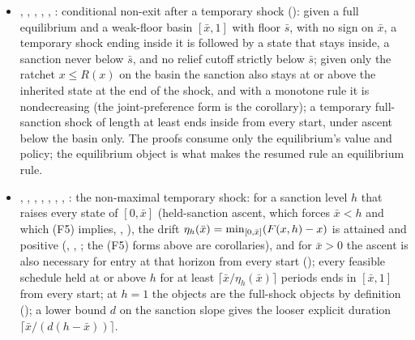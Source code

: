 \begin{itemize}[leftmargin=1.4em,itemsep=1pt]
\item {}, , , , , : conditional non-exit after a temporary shock (): given a full equilibrium and a weak-floor basin $[\bar x,1]$ with floor $\bar s$, with no sign on $\bar x$, a temporary shock ending inside it is followed by a state that stays inside, a sanction never below $\bar s$, and no relief cutoff strictly below $\bar s$; given only the ratchet $x\le R(x)$ on the basin the sanction also stays at or above the inherited state at the end of the shock, and with a monotone rule it is nondecreasing (the joint-preference form is the corollary); a temporary full-sanction shock of length at least  ends inside from every start, under ascent below the basin only. The proofs consume only the equilibrium's value and policy; the equilibrium object is what makes the resumed rule an equilibrium rule.
\item {}, , , , , , , : the non-maximal temporary shock: for a sanction level $h$ that raises every state of $[0,\bar x]$ (held-sanction ascent, which forces $\bar x<h$ and which (F5) implies, , ), the drift $\eta_h(\bar x)=\min_{[0,\bar x]}(F(x,h)-x)$ is attained and positive (, , ; the (F5) forms above are corollaries), and for $\bar x>0$ the ascent is also necessary for entry at that horizon from every start (); every feasible schedule held at or above $h$ for at least $\lceil\bar x/\eta_h(\bar x)\rceil$ periods ends in $[\bar x,1]$ from every start; at $h=1$ the objects are the full-shock objects by definition (); a lower bound $d$ on the sanction slope gives the looser explicit duration $\lceil\bar x/(d(h-\bar x))\rceil$.

\end{itemize}
